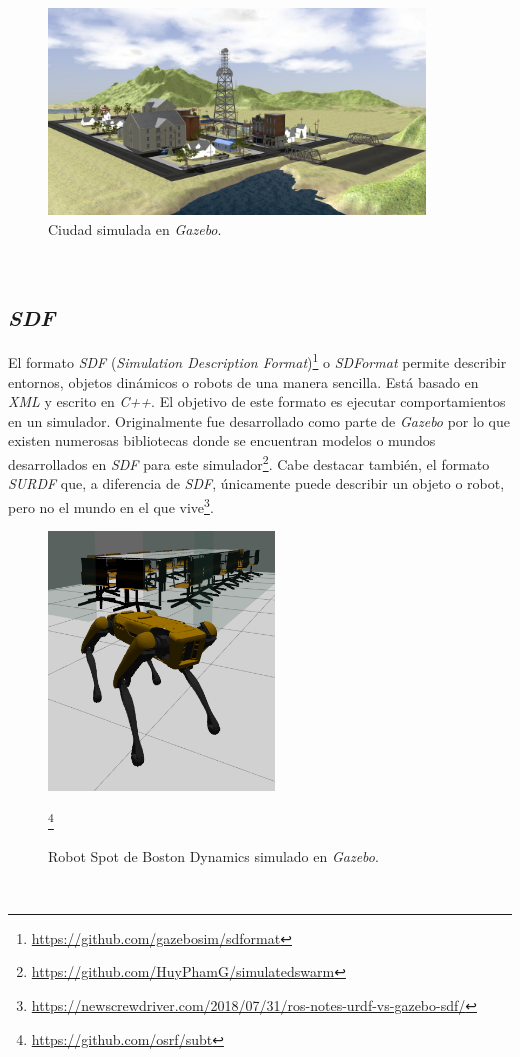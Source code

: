 \begin{figure} [h!]
	\begin{center}
		\includegraphics[width=10cm]{figs/city}
	\end{center}
	\caption{Ciudad simulada en \textit{Gazebo}.}
	\label{fig:city}
\end{figure}\

\subsection{\textit{SDF}}
\label{subsection:sdf}
El formato \textit{SDF} (\textit{Simulation Description Format})\footnote{\url{https://github.com/gazebosim/sdformat}} o \textit{SDFormat} permite describir entornos, objetos dinámicos o robots de una manera sencilla. Está basado en \textit{XML} y escrito en \textit{C++}. El objetivo de este formato es ejecutar comportamientos en un simulador. Originalmente fue desarrollado como parte de \textit{Gazebo} por lo que existen numerosas bibliotecas donde se encuentran modelos o mundos desarrollados en \textit{SDF} para este simulador\footnote{\url{https://github.com/HuyPhamG/simulatedswarm}}. Cabe destacar también, el formato \textit{SURDF} que, a diferencia de \textit{SDF}, únicamente puede describir un objeto o robot, pero no el mundo en el que vive\footnote{\url{https://newscrewdriver.com/2018/07/31/ros-notes-urdf-vs-gazebo-sdf/}}.\\

\begin{figure} [h!]
	\begin{center}
		\includegraphics[width=6cm]{figs/spot}
	\end{center}
	\caption{Robot Spot de Boston Dynamics simulado en \textit{Gazebo}.}\footnote{\url{https://github.com/osrf/subt}}
	\label{fig:spot}
\end{figure}\

